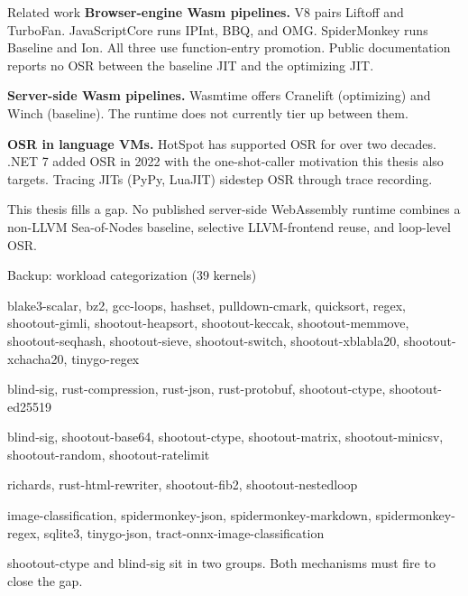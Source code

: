 \documentclass[aspectratio=169,11pt]{beamer}
\newcommand{\code}[1]{{\ttfamily\small #1}}
\begin{document}
\begin{frame}{Related work}
  \small
  \textbf{Browser-engine Wasm pipelines.}
  V8 pairs Liftoff and TurboFan. JavaScriptCore runs IPInt, BBQ, and OMG. SpiderMonkey runs Baseline and Ion.
  All three use function-entry promotion.
  Public documentation reports no OSR between the baseline JIT and the optimizing JIT.

  \vspace{0.4em}
  \textbf{Server-side Wasm pipelines.}
  Wasmtime offers Cranelift (optimizing) and Winch (baseline).
  The runtime does not currently tier up between them.

  \vspace{0.4em}
  \textbf{OSR in language VMs.}
  HotSpot has supported OSR for over two decades.
  .NET 7 added OSR in 2022 with the one-shot-caller motivation this thesis also targets.
  Tracing JITs (PyPy, LuaJIT) sidestep OSR through trace recording.

  \vspace{0.4em}
  \alert{This thesis fills a gap.
  No published server-side WebAssembly runtime combines a non-LLVM Sea-of-Nodes baseline, selective LLVM-frontend reuse, and loop-level OSR.}
\end{frame}

\begin{frame}{Backup: workload categorization (39 kernels)}
  \scriptsize
  \begin{description}\setlength{\itemsep}{3pt}
    \item[Frequent-call (17)] \code{blake3-scalar, bz2, gcc-loops, hashset, pulldown-cmark, quicksort, regex, shootout-gimli, shootout-heapsort, shootout-keccak, shootout-memmove, shootout-seqhash, shootout-sieve, shootout-switch, shootout-xblabla20, shootout-xchacha20, tinygo-regex}
    \item[Hot-leaf (6)] \code{blind-sig, rust-compression, rust-json, rust-protobuf, shootout-ctype, shootout-ed25519}
    \item[One-shot-caller (7)] \code{blind-sig, shootout-base64, shootout-ctype, shootout-matrix, shootout-minicsv, shootout-random, shootout-ratelimit}
    \item[Resistant (4)] \code{richards, rust-html-rewriter, shootout-fib2, shootout-nestedloop}
    \item[Compile-dominated (7)] \code{image-classification, spidermonkey-json, spidermonkey-markdown, spidermonkey-regex, sqlite3, tinygo-json, tract-onnx-image-classification}
  \end{description}
  \vspace{0.3em}
  \code{shootout-ctype} and \code{blind-sig} sit in two groups. Both mechanisms must fire to close the gap.
\end{frame}
\end{document}

